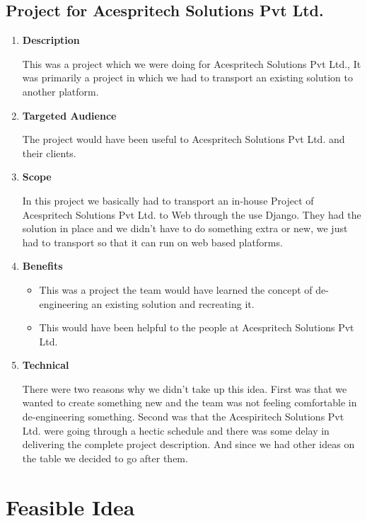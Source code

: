 \documentclass[fleqn,10pt]{../SelfArx} %
\begin{document}
\subsection {Project for Acespritech Solutions Pvt Ltd.}

\vspace{0.5cm}
\begin{enumerate}
\item \textbf{Description}

This was a project which we were doing for Acespritech Solutions Pvt Ltd., It was primarily a project in which we had to transport an existing solution to another platform. 

\item \textbf{Targeted Audience}

The project would have been useful to Acespritech Solutions Pvt Ltd. and their clients.

\item \textbf{Scope}

In this project we basically had to transport an in-house Project of Acespritech Solutions Pvt Ltd. to Web through the use Django. They had the solution in place and we didn't have to do something extra or new, we just had to transport so that it can run on web based platforms.

\item \textbf{Benefits}

\begin{itemize}
    \item	This was a project the team would have learned the concept of de-engineering an existing solution and recreating it.
  \item		This would have been helpful to the people at Acespritech Solutions Pvt Ltd.
\end{itemize}

\item \textbf{Technical}

There were two reasons why we didn't take up this idea. First was that we wanted to create something new and the team was not feeling comfortable in de-engineering something. Second was that the Acespiritech Solutions Pvt Ltd. were going through a hectic schedule and there was some delay in delivering the complete project description. And since we had other ideas on the table we decided to go after them.
\end{enumerate}

\section{Feasible Idea}
\end{document}
